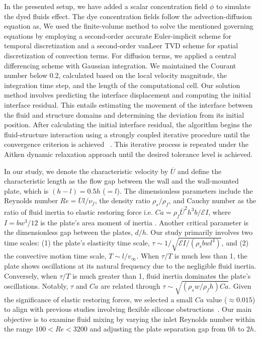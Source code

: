 \documentclass[reprint,a4paper,fleqn]{cas-dc} %
\begin{document}
	In the presented setup, we have added a scalar concentration field $\phi$ to simulate the dyed fluids effect. The dye concentration fields follow the advection-diffusion equation as,
	We used the finite-volume method to solve the mentioned governing equations by employing a second-order accurate Euler-implicit scheme for temporal discretization and a second-order vanLeer TVD scheme for spatial discretization of convection terms. For diffusion terms, we applied a central differencing scheme with Gaussian integration. We maintained the Courant number below 0.2, calculated based on the local velocity magnitude, the integration time step, and the length of the computational cell. Our solution method involves predicting the interface displacement and computing the initial interface residual. This entails estimating the movement of the interface between the fluid and structure domains and determining the deviation from its initial position. After calculating the initial interface residual, the algorithm begins the fluid-structure interaction using a strongly coupled iterative procedure until the convergence criterion is achieved ~\citep{Hrvoje2007, CampbellPaterson2011}. This iterative process is repeated under the Aitken dynamic relaxation approach until the desired tolerance level is achieved.
		
		
	In our study, we denote the characteristic velocity by $\overline{U}$ and define the characteristic length as the flow gap between the wall and the wall-mounted plate, which is $(h - l) = 0.5h$ ($= l$). The dimensionless parameters include the Reynolds number $Re=\overline{U}l/\nu_f$, the density ratio $\rho_s/\rho_f$, and Cauchy number as the ratio of fluid inertia to elastic restoring force i.e. $Ca=\rho_f \overline{U}^2 h^3 b/{\mathcal{E}I}$, where $I=bw^3/12$ is the plate's area moment of inertia \citep{Bhageri2012,Pinelli2015}. Another critical parameter is the dimensionless gap between the plates, $d/h$. Our study primarily involves two time scales: (1) the plate's elasticity time scale, $\tau \sim{1/\sqrt{\mathcal{E}I/(\rho_s bwl^4)}}$, and (2) the convective motion time scale, $T \sim l/v_{\infty}$. When $\tau/T$ is much less than 1, the plate shows oscillations at its natural frequency due to the negligible fluid inertia. Conversely, when $\tau/T$ is much greater than 1, fluid inertia dominates the plate's oscillations. Notably, $\tau$ and $Ca$ are related through $\tau \sim \sqrt{\left({\rho_s w/\rho_f h}\right)Ca}$. Given the significance of elastic restoring forces, we selected a small $Ca$ value ($\approx 0.015$) to align with previous studies involving flexible silicone obstructions~\citep{Vandenberghe2004, Self2019}. Our main objective is to examine fluid mixing by varying the inlet Reynolds number within the range $100 < Re < 3200$ and adjusting the plate separation gap from $0h$ to $2h$.
		
\end{document}
